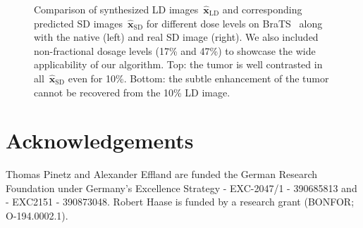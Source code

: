 \documentclass[a4paper,10pt]{article}
\newcommand{\x}{\mathbf{x}}
\newcommand{\LD}{\mathrm{LD}}
\newcommand{\SD}{\mathrm{SD}}
\begin{document}
\begin{figure}[hbt]
{
}
\caption{Comparison of synthesized LD images~$\hat{\x}_\LD$ and corresponding predicted SD images~$\hat{\x}_\SD$ for different dose levels on BraTS~\cite{BaGh21} along with the native (left) and real SD image (right).
We also included non-fractional dosage levels (17\% and 47\%) to showcase the wide applicability of our algorithm.
Top: the tumor is well contrasted in all~$\hat{\x}_\SD$ even for 10\%.
Bottom: the subtle enhancement of the tumor cannot be recovered from the 10\% LD image.}
\label{fig:bratsresults}
\end{figure}



\section*{Acknowledgements}
Thomas Pinetz and Alexander Effland are funded the German Research Foundation under Germany’s Excellence Strategy - EXC-2047/1 - 390685813 and - EXC2151 - 390873048.
Robert Haase is funded by a research grant (BONFOR; O-194.0002.1).



\end{document}
